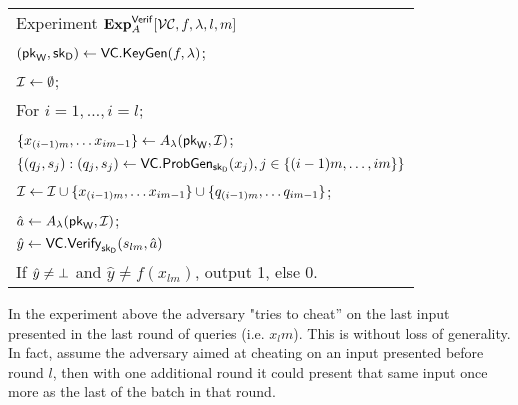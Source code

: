 \vspace{2mm}
\begin{tabular}{l}
\hspace{1mm} Experiment ${\bf Exp}^{\mathsf{Verif}}_{A}[{\cal VC}, f, \lambda, l,m]$\\
\hspace{7mm} $(\mathsf{pk}_{\mathsf{W}}, \mathsf{sk}_{\mathsf{D}}) \gets \mathsf{VC.KeyGen}(f, \lambda)$;\\
\hspace{7mm} ${\cal I} \gets \emptyset$;\\

\hspace{7mm} For $i=1,\ldots,i=l$;\\
\hspace{13mm} $\{ x_{(i-1)m},\dots x_{im-1} \} \gets A_{\lambda}(\mathsf{pk}_{\mathsf{W}},{\cal I})$;\\
\hspace{13mm} $\{(q_{j},s_{j}) : (q_{j},s_{j}) \gets \mathsf{VC.ProbGen}_{\mathsf{sk}_{\mathsf{D}}}(x_j), j \in \{(i-1)m,\dots,im\} \}$\\
\hspace{13mm} ${\cal I} \gets {\cal I} \cup \{ x_{(i-1)m},\dots x_{im-1} \} \cup \{ q_{(i-1)m},\dots q_{im-1} \}$;\\
\hspace{7mm} $\hat{a} \gets A_{\lambda}(\mathsf{pk}_{\mathsf{W}}, {\cal I})$;\\
\hspace{7mm} $\hat{y} \gets \mathsf{VC.Verify}_{\mathsf{sk}_{\mathsf{D}}}(s_{lm},\hat{a})$\\
\hspace{7mm} If $\hat{y} \neq \bot$ and $\hat{y} \neq f(x_{lm})$, output 1, else 0.\\
\end{tabular}
\vspace{2mm}

\begin{remark}
In the experiment above the adversary "tries to cheat'' on the last input presented in the last round of queries (i.e. $x_lm$). This is without loss of generality. In fact, assume the adversary aimed at cheating on an input
presented before round $l$, then with one additional round it could present that same input once more as the last of the batch in that round. 
\end{remark}



